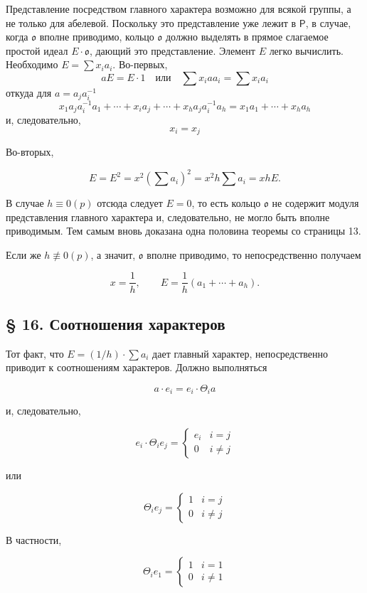 \documentclass[11pt]{article}
\begin{document}
Представление посредством главного характера возможно для всякой группы, а не только для абелевой. Поскольку это представление уже лежит в \(\mathsf P\), в случае, когда \(\mathfrak o\) вполне приводимо, кольцо \(\mathfrak o\) должно выделять в прямое слагаемое простой идеал \(E\cdot\mathfrak o\), дающий это представление. Элемент \(E\) легко вычислить. Необходимо \(E=\sum x_i a_i\). Во-первых,
\[
aE=E\cdot 1\quad\text{или}\quad \sum x_i a a_i=\sum x_i a_i
\]
откуда для \(a=a_j a_i^{-1}\)
\[
x_1a_ja_i^{-1}a_1+\cdots+x_i a_j+\cdots+x_ha_ja_i^{-1}a_h
=x_1a_1+\cdots+x_ha_h
\]
и, следовательно,
\[
x_i=x_j
\]

Во-вторых,

\[
E=E^2=x^2\left(\sum a_i\right)^2=x^2h\sum a_i=xhE.
\]

В случае \(h\equiv0(p)\) отсюда следует \(E=0\), то есть кольцо \(\mathfrak o\) не содержит модуля представления главного характера и, следовательно, не могло быть вполне приводимым. Тем самым вновь доказана одна половина теоремы со страницы 13.

Если же \(h\not\equiv0(p)\), а значит, \(\mathfrak o\) вполне приводимо, то непосредственно получаем

\[
x=\frac{1}{h},\qquad E=\frac{1}{h}(a_1+\cdots+a_h).
\]

\subsection*{§ 16. Соотношения характеров}\label{die-charakterenrelationen}

Тот факт, что \(E=(1/h)\cdot\sum a_i\) дает главный характер, непосредственно приводит к соотношениям характеров. Должно выполняться

\[a \cdot e_i = e_i \cdot \Theta_i a\]

и, следовательно,

\[e_i \cdot \Theta_i e_j = \begin{cases} e_i & i = j \\ 0 & i \neq j \end{cases}\]

или

\[\Theta_i e_j = \begin{cases} 1 & i = j \\ 0 & i \neq j \end{cases}\]

В частности,

\[\Theta_i e_1 = \begin{cases} 1 & i = 1 \\ 0 & i \neq 1 \end{cases}\]
\end{document}
